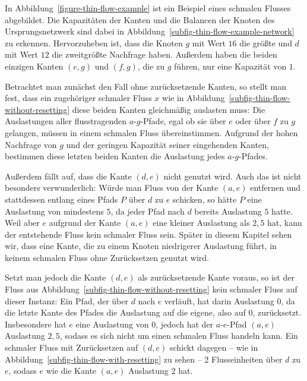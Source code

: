 \begin{example}
	In Abbildung~\ref{figure-thin-flow-example} ist ein Beispiel eines schmalen Flusses abgebildet.
	Die Kapazitäten der Kanten und die Balancen der Knoten des Ursprungsnetzwerk sind dabei in Abbildung~\ref{subfig-thin-flow-example-network} zu erkennen.
	Hervorzuheben ist, dass die Knoten $g$ mit Wert $16$ die größte und $d$ mit Wert $12$ die zweitgrößte Nachfrage haben.
	Außerdem haben die beiden einzigen Kanten $(e,g)$ und $(f,g)$, die zu $g$ führen, nur eine Kapazität von $1$.
	
	Betrachtet man zunächst den Fall ohne zurücksetzende Kanten, so stellt man fest, dass ein zugehöriger schmaler Fluss $x$ wie in Abbildung~\ref{subfig-thin-flow-without-resetting} diese beiden Kanten gleichmäßig auslasten muss:
	Die Auslastungen aller flusstragenden $a$-$g$-Pfade, egal ob sie über $e$ oder über $f$ zu $g$ gelangen, müssen in einem schmalen Fluss übereinstimmen.
	Aufgrund der hohen Nachfrage von $g$ und der geringen Kapazität seiner eingehenden Kanten, bestimmen diese letzten beiden Kanten die Auslastung jedes $a$-$g$-Pfades.
	
	Außerdem fällt auf, dass die Kante $(d,e)$ nicht genutzt wird.
	Auch das ist nicht besonders verwunderlich:
	Würde man Fluss von der Kante $(a, e)$ entfernen und stattdessen entlang eines Pfads $P$ über $d$ zu $e$ schicken, so hätte $P$ eine Auslastung von mindestens $5$, da jeder Pfad nach $d$ bereits Auslastung $5$ hatte.
	Weil aber $e$ aufgrund der Kante $(a,e)$ eine kleiner Auslastung als $2{,}5$ hat, kann der entstehende Fluss kein schmaler Fluss sein.
	Später in diesem Kapitel sehen wir, dass eine Kante, die zu einem Knoten niedrigerer Auslastung führt, in keinem schmalen Fluss ohne Zurücksetzen genutzt wird.
	
	Setzt man jedoch die Kante $(d, e)$ als zurücksetzende Kante voraus, so ist der Fluss aus Abbildung~\ref{subfig-thin-flow-without-resetting} kein schmaler Fluss auf dieser Instanz:
	Ein Pfad, der über $d$ nach $e$ verläuft, hat darin Auslastung $0$, da die letzte Kante des Pfades die Auslastung auf die eigene, also auf $0$, zurücksetzt.
	Insbesondere hat $e$ eine Auslastung von $0$, jedoch hat der $a$-$e$-Pfad $(a, e)$ Auslastung $2{,}5$, sodass es sich nicht um einen schmalen Fluss handeln kann.
	Ein schmaler Fluss mit Zurücksetzen auf $(d, e)$ schickt dagegen -- wie in Abbildung~\ref{subfig-thin-flow-with-resetting} zu sehen -- $2$ Flusseinheiten über $d$ zu $e$, sodass $e$ wie die Kante $(a,e)$ Auslastung $2$ hat.
\end{example}

